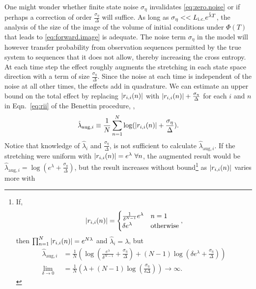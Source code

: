 One might wonder whether finite state noise $\sigma_\eta$ invalidates
\eqref{eq:zero.noise} or if perhaps a correction of order
$\frac{\sigma_\eta}{\Delta}$ will suffice.  As long as $\sigma_\eta <<
L_{\text{i.c.}} e^{\hat \lambda T}$, the analysis of the size of the image of the
volume of initial conditions under $\Phi(T)$ that leads to
\eqref{eq:forward.image} is adequate.  The noise term $\sigma_\eta$ in
the model will however transfer probability from observation sequences
permitted by the true system to sequences that it does not allow,
thereby increasing the cross entropy.  At each time step the effect
roughly augments the stretching in each state space direction with a
term of size $\frac{\sigma_\eta}{\Delta}$.  Since the noise at each
time is independent of the noise at all other times, the effects add
in quadrature.  We can estimate an upper bound on the total effect by
replacing $ \left| {r_{i,i}}{(n)} \right|$ with $ \left|
  {r_{i,i}}{(n)} \right| + \frac{\sigma_\eta}{\Delta}$ for each $i$
and $n$ in Eqn.~\eqref{eq:rii} of the Benettin procedure, \ie,
\begin{equation}
  \label{eq:LE.aug}
  \hat \lambda_{\text{aug},i} \equiv \frac{1}{N}  \sum_{n=1}^N \log( \left|
    {r_{i,i}}{(n)} \right|  + \frac{\sigma_\eta}{\Delta}).
\end{equation}
Notice that knowledge of $\hat \lambda_i$ and $\frac{\sigma_\eta}
{\Delta}$, is not sufficient to calculate $\hat
\lambda_{\text{aug},i}$.  If the stretching were uniform with $\left|
  {r_{i,i}}{(n)} \right| = e^{\lambda} ~\forall n$, the augmented
result would be $\hat \lambda_{\text{aug},i} = \log\left( e^\lambda +
  \frac{\sigma_\eta} {\Delta} \right)$, but the result increases
without bound\footnote{If,
  \begin{equation*}
     \left| {r_{i,i}}{(n)} \right| = \begin{cases}
       \frac{1}{\delta^{N-1}} e^\lambda & n=1\\
       \delta e^\lambda & \text{otherwise} \end{cases},
   \end{equation*}
   then $\prod_{n=1}^N \left| {r_{i,i}}{(n)} \right| = e^{N\lambda}$
   and $\hat \lambda_i = \lambda$, but
   \begin{align*}
   \hat \lambda_{\text{aug},i} &=
   \frac{1}{N} \left(
     \log\left(
       \frac{e^\lambda}{\delta^{N-1}} + \frac{\sigma_\eta}{\Delta}
     \right) +
     (N-1) \log\left( \delta e^\lambda + \frac{\sigma_\eta}{\Delta}
     \right) 
                            \right) \\
    \lim_{\delta \to 0} &= \frac{1}{N}
   \left( \lambda + (N-1) \log
     \left( \frac{\sigma_\eta}{\delta\Delta} \right)
   \right) \rightarrow \infty.
   \end{align*} } as $ \left| {r_{i,i}}{(n)} \right|$ varies more with
